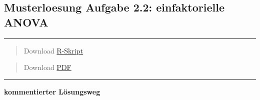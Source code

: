 \documentclass[
]{article}
\author{}
\date{\vspace{-2.5em}}
\begin{document}
\hypertarget{musterloesung-aufgabe-2.2-einfaktorielle-anova}{%
\subsection{Musterloesung Aufgabe 2.2: einfaktorielle
ANOVA}\label{musterloesung-aufgabe-2.2-einfaktorielle-anova}}

\begin{center}\rule{0.5\linewidth}{0.5pt}\end{center}

\begin{quote}
Download \href{14_Statistik2/RFiles/solution_stat2.2.R}{R-Skript}
\end{quote}

\begin{quote}
Download \href{14_Statistik2/RFiles/solution_stat2.2.pdf}{PDF}
\end{quote}

\begin{center}\rule{0.5\linewidth}{0.5pt}\end{center}

\textbf{kommentierter Lösungsweg}
\end{document}
